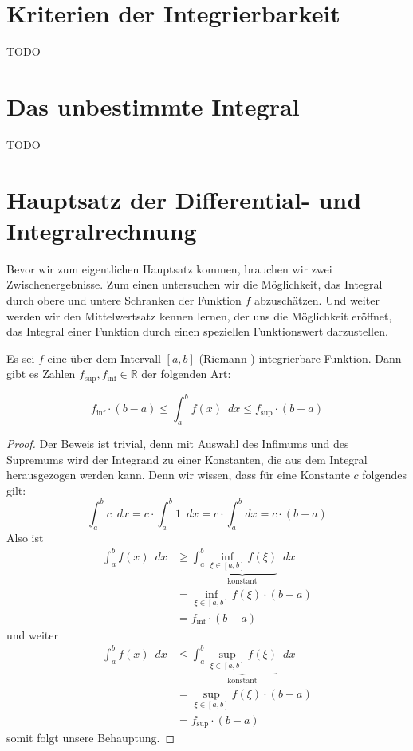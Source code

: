 \section{Kriterien der Integrierbarkeit}
TODO 

\section{Das unbestimmte Integral}
TODO

\section{Hauptsatz der Differential- und Integralrechnung}

Bevor wir zum eigentlichen Hauptsatz kommen, brauchen wir zwei Zwischenergebnisse. Zum einen untersuchen wir die Möglichkeit, das Integral durch obere und untere Schranken der Funktion $f$ abzuschätzen. Und weiter werden wir den Mittelwertsatz kennen lernen, der uns die Möglichkeit eröffnet, das Integral einer Funktion durch einen speziellen Funktionswert darzustellen. 

\begin{satz}\label{satz:mittel}
Es sei $f$ eine über dem Intervall $[a,b]$ (Riemann-) integrierbare Funktion. Dann gibt es Zahlen $f_{\sup}, f_{\inf} \in \mathbb{R}$ der folgenden Art:

\begin{equation}
f_{\inf}\cdot (b-a) \le \int_{a}^{b} f(x) \enspace dx \le f_{\sup} \cdot (b-a)
\end{equation}
\end{satz}
\begin{proof}
Der Beweis ist trivial, denn mit Auswahl des Infimums und des Supremums wird der Integrand zu einer Konstanten, die aus dem Integral herausgezogen werden kann. Denn wir wissen, dass für eine Konstante $c$ folgendes gilt:
\begin{equation}
\int_a^b c \enspace dx = c\cdot \int_a^b 1 \enspace dx = c\cdot \int_a^b dx = c\cdot(b-a)
\end{equation}
Also ist
\begin{equation}
\begin{split}
\int_a^b f(x)\enspace dx &\ge \int_a^b \underbrace{\inf_{\xi \in [a,b] } f(\xi)}_{\text{konstant}} \enspace dx \\
 &= \inf_{\xi \in [a,b] } f(\xi) \cdot (b-a) \\
 &= f_{\inf}\cdot (b-a)
\end{split}
\end{equation}
und weiter
\begin{equation}
\begin{split}
\int_a^b f(x)\enspace dx &\le \int_a^b \underbrace{\sup_{\xi \in [a,b] } f(\xi)}_{\text{konstant}} \enspace dx \\
 &= \sup_{\xi \in [a,b] } f(\xi) \cdot (b-a) \\
 &= f_{\sup}\cdot (b-a)
\end{split}
\end{equation}
somit folgt unsere Behauptung.
\end{proof}


